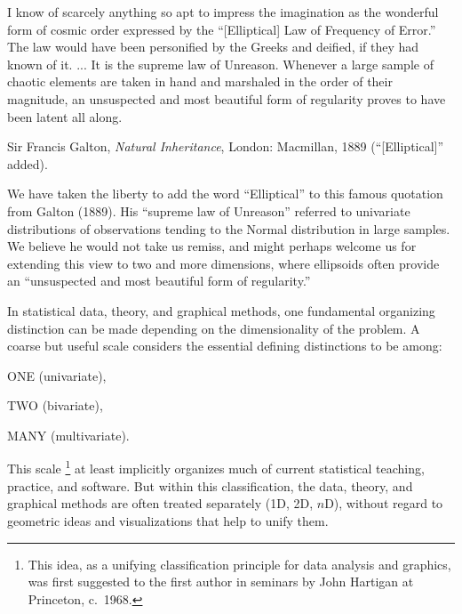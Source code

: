 
\epigraph{I know of scarcely anything so apt to impress the imagination as the
wonderful form of cosmic order expressed by the ``[Elliptical] Law of Frequency of
Error.''
The law would have been personified by the Greeks and deified, if they had known of it.
... %
    It is the supreme law of Unreason.
	Whenever a large sample of chaotic elements are taken in hand
	and marshaled in the order of their magnitude,
	an unsuspected and most beautiful form of regularity proves to have been
	latent all along.
}
{Sir Francis Galton, \emph{Natural Inheritance}, London: Macmillan, 1889
(``[Elliptical]'' added).
}

We have taken the liberty to add the word ``Elliptical'' to this famous quotation from Galton (1889).
His ``supreme law of Unreason'' referred to univariate distributions of observations tending to the
Normal distribution in large samples.  We believe he would not take us remiss, and might perhaps
welcome us for extending this view to
two and more dimensions, where ellipsoids often provide
an ``unsuspected and most beautiful form of regularity.''

In statistical data, theory, and graphical methods, one fundamental organizing
distinction can be made depending
on the dimensionality of the problem.  A coarse but useful scale considers the essential defining
distinctions to be among:
\begin{itemize*}
 \item ONE (univariate),
 \item TWO (bivariate),
 \item MANY (multivariate).
\end{itemize*}
This scale%
\footnote{
This idea, as a unifying classification principle for data analysis and graphics,
was first suggested to the first author in
seminars by John Hartigan at Princeton, c.~1968.
}
at least implicitly organizes much of current statistical teaching, practice, and software.
But within this classification, the data, theory, and graphical methods are often treated separately (1D, 2D, $n$D),
without regard to geometric ideas and visualizations that help to unify them.

